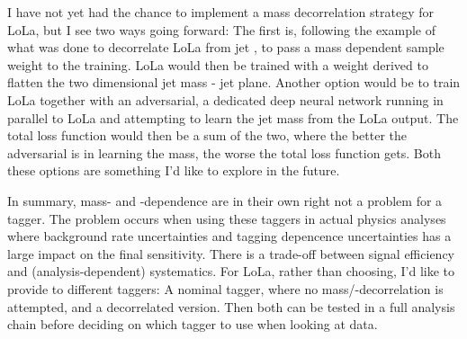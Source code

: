I have not yet had the chance to implement a mass decorrelation strategy for LoLa, but I see two ways going forward: The first is, following the example of what was done to decorrelate LoLa from jet \PT, to pass a mass dependent sample weight to the training. LoLa would then be trained with a weight derived to flatten the two dimensional jet mass - jet \PT plane. Another option would be to train LoLa together with an adversarial, a dedicated deep neural network running in parallel to LoLa and attempting to learn the jet mass from the LoLa output. The total loss function would then be a sum of the two, where the better the adversarial is in learning the mass, the worse the total loss function gets. Both these options are something I'd like to explore in the future.\par

In summary, mass- and \PT-dependence are in their own right not a problem for a tagger. The problem occurs when using these taggers in actual physics analyses where background rate uncertainties and tagging \PT depencence uncertainties has a large impact on the final sensitivity. There is a trade-off between signal efficiency and (analysis-dependent) systematics. For LoLa, rather than choosing, I'd like to provide to different taggers: A nominal tagger, where no mass/\PT-decorrelation is attempted, and a decorrelated version. Then both can be tested in a full analysis chain before deciding on which tagger to use when looking at data.

